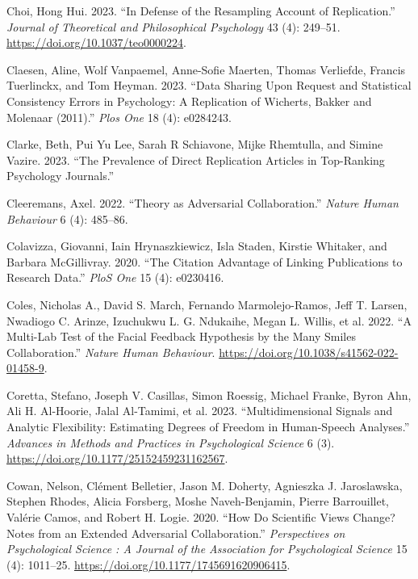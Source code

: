 \documentclass[
  letterpaper,
  DIV=11,
  numbers=noendperiod]{scrreprt}
\newlength{\cslhangindent}
\newenvironment{CSLReferences}[2] %
 {\begin{list}{}{%
  \setlength{\itemindent}{0pt}
  \setlength{\leftmargin}{0pt}
  \setlength{\parsep}{0pt}
  \ifodd #1
   \setlength{\leftmargin}{\cslhangindent}
   \setlength{\itemindent}{-1\cslhangindent}
  \fi
  \setlength{\itemsep}{#2\baselineskip}}}
 {\end{list}}
\begin{document}
\begin{CSLReferences}{1}{0}
Choi, Hong Hui. 2023. {``In Defense of the Resampling Account of
Replication.''} \emph{Journal of Theoretical and Philosophical
Psychology} 43 (4): 249--51. \url{https://doi.org/10.1037/teo0000224}.

Claesen, Aline, Wolf Vanpaemel, Anne-Sofie Maerten, Thomas Verliefde,
Francis Tuerlinckx, and Tom Heyman. 2023. {``Data Sharing Upon Request
and Statistical Consistency Errors in Psychology: A Replication of
Wicherts, Bakker and Molenaar (2011).''} \emph{Plos One} 18 (4):
e0284243.

Clarke, Beth, Pui Yu Lee, Sarah R Schiavone, Mijke Rhemtulla, and Simine
Vazire. 2023. {``The Prevalence of Direct Replication Articles in
Top-Ranking Psychology Journals.''}

Cleeremans, Axel. 2022. {``Theory as Adversarial Collaboration.''}
\emph{Nature Human Behaviour} 6 (4): 485--86.

Colavizza, Giovanni, Iain Hrynaszkiewicz, Isla Staden, Kirstie Whitaker,
and Barbara McGillivray. 2020. {``The Citation Advantage of Linking
Publications to Research Data.''} \emph{PloS One} 15 (4): e0230416.

Coles, Nicholas A., David S. March, Fernando Marmolejo-Ramos, Jeff T.
Larsen, Nwadiogo C. Arinze, Izuchukwu L. G. Ndukaihe, Megan L. Willis,
et al. 2022. {``A Multi-Lab Test of the Facial Feedback Hypothesis by
the Many Smiles Collaboration.''} \emph{Nature Human Behaviour}.
\url{https://doi.org/10.1038/s41562-022-01458-9}.

Coretta, Stefano, Joseph V. Casillas, Simon Roessig, Michael Franke,
Byron Ahn, Ali H. Al-Hoorie, Jalal Al-Tamimi, et al. 2023.
{``Multidimensional Signals and Analytic Flexibility: Estimating Degrees
of Freedom in Human-Speech Analyses.''} \emph{Advances in Methods and
Practices in Psychological Science} 6 (3).
\url{https://doi.org/10.1177/25152459231162567}.

Cowan, Nelson, Clément Belletier, Jason M. Doherty, Agnieszka J.
Jaroslawska, Stephen Rhodes, Alicia Forsberg, Moshe Naveh-Benjamin,
Pierre Barrouillet, Valérie Camos, and Robert H. Logie. 2020. {``How Do
Scientific Views Change? Notes from an Extended Adversarial
Collaboration.''} \emph{Perspectives on Psychological Science : A
Journal of the Association for Psychological Science} 15 (4): 1011--25.
\url{https://doi.org/10.1177/1745691620906415}.


\end{CSLReferences}
\end{document}
